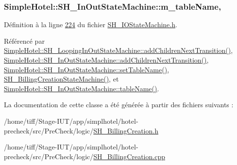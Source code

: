\hypertarget{classSimpleHotel_1_1SH__InOutStateMachine_a15c063debdaa4c87bd4925867a13ce9e}{
\subsubsection[{m\-\_\-table\-Name}]{\setlength{\rightskip}{0pt plus 5cm}Simple\-Hotel\-::\-S\-H\-\_\-\-In\-Out\-State\-Machine\-::m\-\_\-table\-Name\hspace{0.3cm}{\ttfamily [protected]}, {\ttfamily [inherited]}}}\label{classSimpleHotel_1_1SH__InOutStateMachine_a15c063debdaa4c87bd4925867a13ce9e}


Définition à la ligne \hyperlink{SH__IOStateMachine_8h_source_l00224}{224} du fichier \hyperlink{SH__IOStateMachine_8h_source}{S\-H\-\_\-\-I\-O\-State\-Machine.\-h}.



Référencé par \hyperlink{classSimpleHotel_1_1SH__LoopingInOutStateMachine_a2ac2ff43d97fd1b12e1b30d6818f33e4}{Simple\-Hotel\-::\-S\-H\-\_\-\-Looping\-In\-Out\-State\-Machine\-::add\-Children\-Next\-Transition()}, \hyperlink{classSimpleHotel_1_1SH__InOutStateMachine_aaf5afe04d6e4d3d5ebf0b5f1b00eddf1}{Simple\-Hotel\-::\-S\-H\-\_\-\-In\-Out\-State\-Machine\-::add\-Children\-Next\-Transition()}, \hyperlink{classSimpleHotel_1_1SH__InOutStateMachine_adae23a212e9ba1e590f062994cd367a6}{Simple\-Hotel\-::\-S\-H\-\_\-\-In\-Out\-State\-Machine\-::set\-Table\-Name()}, \hyperlink{classSimpleHotel_1_1SH__BillingCreationStateMachine_a8c7d39e11d0ced1fd9c27a5550465b86}{S\-H\-\_\-\-Billing\-Creation\-State\-Machine()}, et \hyperlink{classSimpleHotel_1_1SH__InOutStateMachine_a9fd170fd458e524ac0629b64d5323a45}{Simple\-Hotel\-::\-S\-H\-\_\-\-In\-Out\-State\-Machine\-::table\-Name()}.



La documentation de cette classe a été générée à partir des fichiers suivants \-:\begin{DoxyCompactItemize}
\item 
/home/tiff/\-Stage-\/\-I\-U\-T/app/simplhotel/hotel-\/precheck/src/\-Pre\-Check/logic/\hyperlink{SH__BillingCreation_8h}{S\-H\-\_\-\-Billing\-Creation.\-h}\item 
/home/tiff/\-Stage-\/\-I\-U\-T/app/simplhotel/hotel-\/precheck/src/\-Pre\-Check/logic/\hyperlink{SH__BillingCreation_8cpp}{S\-H\-\_\-\-Billing\-Creation.\-cpp}\end{DoxyCompactItemize}
